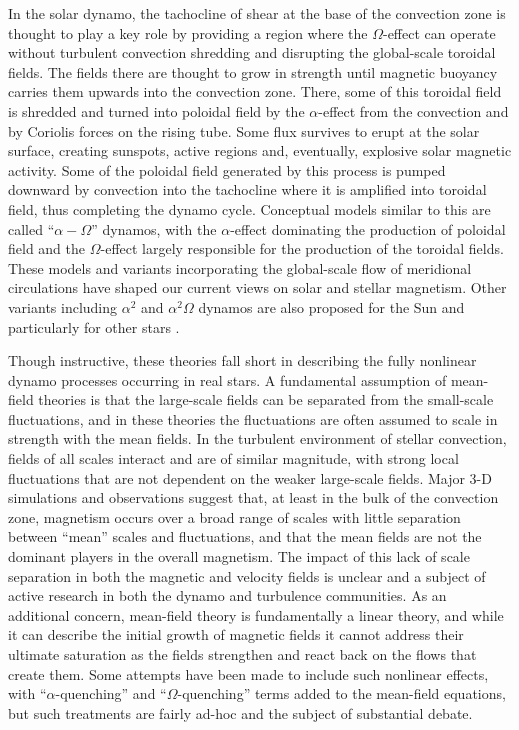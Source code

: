 In the solar dynamo, the tachocline of shear at the base of the
convection zone is thought to play a key role by providing a region
where the $\Omega$-effect can operate without turbulent convection
shredding and disrupting the global-scale toroidal fields.  The fields
there are thought to grow in strength until magnetic buoyancy carries
them upwards into the convection zone.  There, some of this toroidal
field is shredded and turned into poloidal field by the
$\alpha$-effect from the convection and by Coriolis forces on the
rising tube.  Some flux survives to erupt at the solar surface, creating
sunspots, active regions and, eventually, explosive solar magnetic
activity.  Some of the poloidal field generated by this process is pumped
downward by convection into the tachocline where it is amplified into
toroidal field, thus completing the dynamo cycle.  Conceptual models
similar to this are called ``$\alpha-\Omega$'' dynamos, with the
$\alpha$-effect dominating the production of poloidal field and the
$\Omega$-effect largely responsible for the production of the toroidal
fields.  These models and variants incorporating the global-scale
flow of meridional circulations have shaped our current views on
solar and stellar magnetism.  
Other variants including $\alpha^2$ and 
$\alpha^2\Omega$ dynamos are also proposed for the Sun and
particularly for other stars
\citep[e.g.,][]{Kuker&Rudiger_1999,Kuker&Rudiger_2005_AN, Chabrier&Kuker_2006}.   


Though instructive, these theories
fall short in describing the fully nonlinear dynamo processes occurring
in real stars.  A fundamental assumption of mean-field theories is that the
large-scale fields can be separated from the small-scale fluctuations,
and in these theories the fluctuations are often assumed to scale in
strength with the mean fields.  In the turbulent environment of
stellar convection, fields of all scales interact and are of similar
magnitude, with strong local fluctuations that are not dependent on
the weaker large-scale fields.  Major 3-D simulations
\citep[e.g.,][]{Brun_et_al_2004, Browning_et_al_2006}
and observations suggest that,
at least in the bulk of the convection zone, magnetism occurs over a
broad range of scales with little separation between ``mean'' scales
and fluctuations, and that the mean fields are not the dominant
players in the overall magnetism.  The impact of this lack of scale
separation in both the magnetic and velocity fields is unclear and a
subject of active research in both the dynamo and turbulence
communities.  As an additional concern, mean-field theory is
fundamentally a linear theory, and while it can describe the initial
growth of magnetic fields it cannot address their ultimate saturation
as the fields strengthen and react back on the flows that create
them.  Some attempts have been made to include such nonlinear
effects, with ``$\alpha$-quenching'' and ``$\Omega$-quenching'' terms
added to the mean-field equations, but such treatments are fairly
ad-hoc and the subject of substantial debate.


